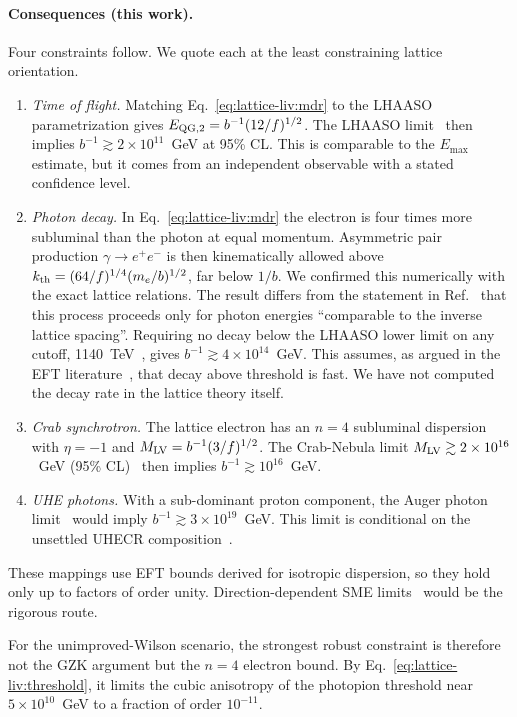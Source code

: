 \paragraph{Consequences (this work).}
Four constraints follow. We quote each at the least constraining lattice orientation.
\begin{enumerate}
\item \emph{Time of flight.} Matching Eq.~\eqref{eq:lattice-liv:mdr} to the LHAASO parametrization gives $E_{\rm QG,2}=b^{-1}(12/f)^{1/2}$. The LHAASO limit~\cite{LHAASO2024stringent} then implies $b^{-1}\gtrsim2\times10^{11}$~GeV at 95\% CL. This is comparable to the $E_{\max}$ estimate, but it comes from an independent observable with a stated confidence level.
\item \emph{Photon decay.} In Eq.~\eqref{eq:lattice-liv:mdr} the electron is four times more subluminal than the photon at equal momentum. Asymmetric pair production $\gamma\to e^+e^-$ is then kinematically allowed above $k_{\rm th}=(64/f)^{1/4}(m_e/b)^{1/2}$, far below $1/b$. We confirmed this numerically with the exact lattice relations. The result differs from the statement in Ref.~\cite{Beane2014constraints} that this process proceeds only for photon energies ``comparable to the inverse lattice spacing''. Requiring no decay below the LHAASO lower limit on any cutoff, 1140~TeV~\cite{LHAASO2022exploring}, gives $b^{-1}\gtrsim4\times10^{14}$~GeV. This assumes, as argued in the EFT literature~\cite{Jacobson2006lorentz,Liberati2013tests}, that decay above threshold is fast. We have not computed the decay rate in the lattice theory itself.
\item \emph{Crab synchrotron.} The lattice electron has an $n=4$ subluminal dispersion with $\eta=-1$ and $M_{\rm LV}=b^{-1}(3/f)^{1/2}$. The Crab-Nebula limit $M_{\rm LV}\gtrsim2\times10^{16}$~GeV (95\% CL)~\cite{Liberati2012scale} then implies $b^{-1}\gtrsim10^{16}$~GeV.
\item \emph{UHE photons.} With a sub-dominant proton component, the Auger photon limit~\cite{PierreAuger2022testing} would imply $b^{-1}\gtrsim3\times10^{19}$~GeV. This limit is conditional on the unsettled UHECR composition~\cite{Liberati2013tests}.
\end{enumerate}
These mappings use EFT bounds derived for isotropic dispersion, so they hold only up to factors of order unity. Direction-dependent SME limits~\cite{Vasileiou2013constraints,Kostelecky2011data} would be the rigorous route.

For the unimproved-Wilson scenario, the strongest robust constraint is therefore not the GZK argument but the $n=4$ electron bound. By Eq.~\eqref{eq:lattice-liv:threshold}, it limits the cubic anisotropy of the photopion threshold near $5\times10^{10}$~GeV to a fraction of order $10^{-11}$.

